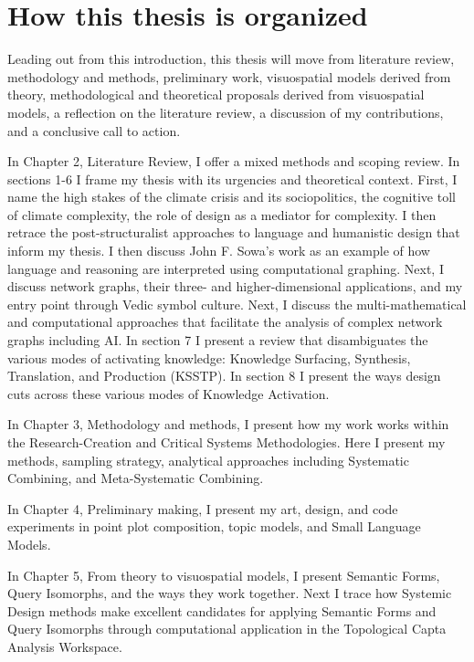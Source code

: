 \section{How this thesis is organized}
Leading out from this introduction, this thesis will move from literature review, methodology and methods, preliminary work, visuospatial models derived from theory, methodological and theoretical proposals derived from visuospatial models, a reflection on the literature review, a discussion of my contributions, and a conclusive call to action. 

In Chapter 2, Literature Review, I offer a mixed methods and scoping review. In sections 1-6 I frame my thesis with its urgencies and theoretical context. First, I name the high stakes of the climate crisis and its sociopolitics, the cognitive toll of climate complexity, the role of design as a mediator for complexity. I then retrace the post-structuralist approaches to language and humanistic design that inform my thesis. I then discuss John F. Sowa's work as an example of how language and reasoning are interpreted using computational graphing. Next, I discuss network graphs, their three- and higher-dimensional applications, and my entry point through Vedic symbol culture. Next, I discuss the multi-mathematical and computational approaches that facilitate the analysis of complex network graphs including AI. In section 7 I present a review that disambiguates the various modes of activating knowledge: Knowledge Surfacing, Synthesis, Translation, and Production (KSSTP). In section 8 I present the ways design cuts across these various modes of Knowledge Activation.

In Chapter 3, Methodology and methods, I present how my work works within the Research-Creation and Critical Systems Methodologies. Here I present my methods, sampling strategy, analytical approaches including Systematic Combining, and Meta-Systematic Combining. 

In Chapter 4, Preliminary making, I present my art, design, and code experiments in point plot composition, topic models, and Small Language Models. 

In Chapter 5, From theory to visuospatial models, I present Semantic Forms, Query Isomorphs, and the ways they work together. Next I trace how Systemic Design methods make excellent candidates for applying Semantic Forms and Query Isomorphs through computational application in the Topological Capta Analysis Workspace.

